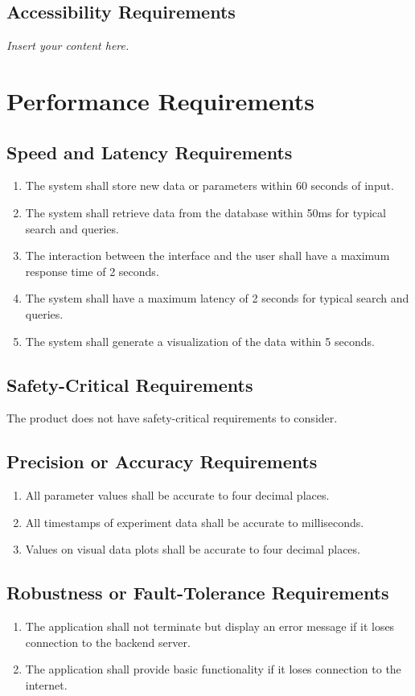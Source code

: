 \documentclass[12pt]{article}
\newcommand{\lips}{\textit{Insert your content here.}}
\begin{document}
\subsection{Accessibility Requirements}
\lips

\section{Performance Requirements}
\subsection{Speed and Latency Requirements}
\begin{enumerate}
\item The system shall store new data or parameters within 60 seconds of input.
\item The system shall retrieve data from the database within 50ms for typical search and queries.
\item The interaction between the interface and the user shall have a maximum response time of 2 seconds.
\item The system shall have a maximum latency of 2 seconds for typical search and queries.
\item The system shall generate a visualization of the data within 5 seconds.
\end{enumerate}

\subsection{Safety-Critical Requirements}
The product does not have safety-critical requirements to consider.

\subsection{Precision or Accuracy Requirements}
\begin{enumerate}
  \item All parameter values shall be accurate to four decimal places.
  \item All timestamps of experiment data shall be accurate to milliseconds. 
  \item Values on visual data plots shall be accurate to four decimal places.
\end{enumerate}

\subsection{Robustness or Fault-Tolerance Requirements}
\begin{enumerate}
  \item The application shall not terminate but display an error message if it loses connection to the backend server.
  \item The application shall provide basic functionality if it loses connection to the internet.
\end{enumerate}
\end{document}
